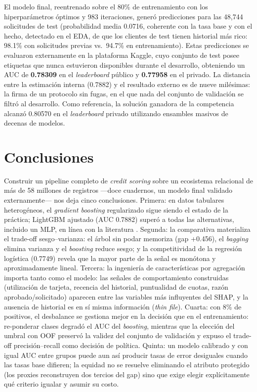 \documentclass[journal]{IEEEtran}
\begin{document}
El modelo final, reentrenado sobre el 80\% de entrenamiento con los hiperparámetros óptimos y 983 iteraciones, generó predicciones para las 48{,}744 solicitudes de test (probabilidad media 0.0716, coherente con la tasa base y con el hecho, detectado en el EDA, de que los clientes de test tienen historial más rico: 98.1\% con solicitudes previas vs.\ 94.7\% en entrenamiento). Estas predicciones se evaluaron externamente en la plataforma Kaggle, cuyo conjunto de test posee etiquetas que nunca estuvieron disponibles durante el desarrollo, obteniendo un AUC de \textbf{0.78309} en el \textit{leaderboard} público y \textbf{0.77958} en el privado. La distancia entre la estimación interna (0.7882) y el resultado externo es de nueve milésimas: la firma de un protocolo sin fugas, en el que nada del conjunto de validación se filtró al desarrollo. Como referencia, la solución ganadora de la competencia alcanzó 0.80570 en el \textit{leaderboard} privado utilizando ensambles masivos de decenas de modelos.

\section{Conclusiones}

Construir un pipeline completo de \textit{credit scoring} sobre un ecosistema relacional de más de 58 millones de registros ---doce cuadernos, un modelo final validado externamente--- nos deja cinco conclusiones. Primera: en datos tabulares heterogéneos, el \textit{gradient boosting} regularizado sigue siendo el estado de la práctica; LightGBM ajustado (AUC 0.7882) superó a todas las alternativas, incluido un MLP, en línea con la literatura \cite{lessmann2015,gunnarsson2021}. Segunda: la comparativa materializa el trade-off sesgo--varianza: el árbol sin podar memoriza (gap +0.456), el \textit{bagging} elimina varianza y el \textit{boosting} reduce sesgo; y la competitividad de la regresión logística (0.7749) revela que la mayor parte de la señal es monótona y aproximadamente lineal. Tercera: la ingeniería de características por agregación importa tanto como el modelo: las señales de comportamiento construidas (utilización de tarjeta, recencia del historial, puntualidad de cuotas, razón aprobado/solicitado) aparecen entre las variables más influyentes del SHAP, y la ausencia de historial es en sí misma información (\textit{thin file}). Cuarta: con 8\% de positivos, el desbalance se gestiona mejor en la decisión que en el entrenamiento: re-ponderar clases degradó el AUC del \textit{boosting}, mientras que la elección del umbral con OOF preservó la validez del conjunto de validación y expuso el trade-off precisión--recall como decisión de política. Quinta: un modelo calibrado y con igual AUC entre grupos puede aun así producir tasas de error desiguales cuando las tasas base difieren; la equidad no se resuelve eliminando el atributo protegido (los proxies reconstruyen dos tercios del gap) sino que exige elegir explícitamente qué criterio igualar y asumir su costo.
\end{document}
